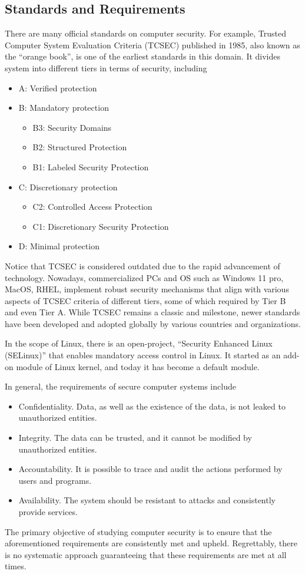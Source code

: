 \subsection{Standards and Requirements}

There are many official standards on computer security. For example, Trusted Computer System Evaluation Criteria (TCSEC) published in 1985, also known as the ``orange book'', is one of the earliest standards in this domain. It divides system into different tiers in terms of security, including
\begin{itemize}
	\item A: Verified protection
	\item B: Mandatory protection
	\begin{itemize}
		\item B3: Security Domains
		\item B2: Structured Protection
		\item B1: Labeled Security Protection
	\end{itemize}
	\item C: Discretionary protection
	\begin{itemize}
		\item C2: Controlled Access Protection
		\item C1: Discretionary Security Protection
	\end{itemize}
	\item D: Minimal protection
\end{itemize}
Notice that TCSEC is considered outdated due to the rapid advancement of technology. Nowadays, commercialized PCs and OS such as Windows 11 pro, MacOS, RHEL, implement robust security mechanisms that align with various aspects of TCSEC criteria of different tiers, some of which required by Tier B and even Tier A. While TCSEC remains a classic and milestone, newer standards have been developed and adopted globally by various countries and organizations.

In the scope of Linux, there is an open-project, ``Security Enhanced Linux (SELinux)'' that enables mandatory access control in Linux. It started as an add-on module of Linux kernel, and today it has become a default module.

In general, the requirements of secure computer systems include
\begin{itemize}
	\item Confidentiality. Data, as well as the existence of the data, is not leaked to unauthorized entities.
	\item Integrity. The data can be trusted, and it cannot be modified by unauthorized entities.
	\item Accountability. It is possible to trace and audit the actions performed by users and programs.
	\item Availability. The system should be resistant to attacks and consistently provide services.
\end{itemize}
The primary objective of studying computer security is to ensure that the aforementioned requirements are consistently met and upheld. Regrettably, there is no systematic approach guaranteeing that these requirements are met at all times.

